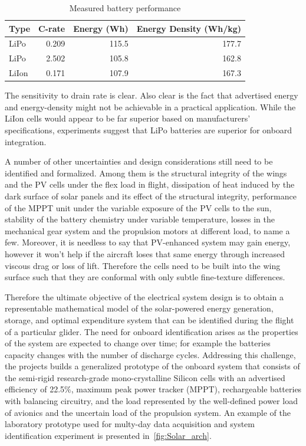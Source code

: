 \documentclass{ifacconf}
\begin{document}
\begin{table}
  \caption{Measured battery performance}
  \centering
  \begin{tabular}{ l | r | r | r }
  Type &C-rate & Energy (Wh) & Energy Density (Wh/kg) \\
  \hline
  LiPo & 0.209 & 115.5 & 177.7 \\
  LiPo & 2.502 & 105.8 & 162.8 \\
  LiIon & 0.171 & 107.9 & 167.3 \\
  \end{tabular}
  \label{Batt_performance}
\end{table}
The sensitivity to drain rate is clear. Also clear is the fact that advertised energy and energy-density might not be achievable in a practical application. While the LiIon cells would appear to be far superior based on manufacturers' specifications, experiments suggest that LiPo batteries are superior for onboard integration.

A number of other uncertainties and design considerations still need to be identified and formalized. Among them is the structural integrity of the wings and the PV cells under the flex load in flight, dissipation of heat induced by the dark surface of solar panels and its effect of the structural integrity,  performance of the MPPT unit under the variable exposure of the PV cells to the sun, stability of the battery chemistry under variable temperature, losses in the mechanical gear system and the propulsion motors at different load, to name a few. Moreover, it is needless to say that PV-enhanced system may gain energy, however it won't help if the aircraft loses that same energy through increased viscous drag or loss of lift. Therefore the cells need to be built into the wing surface such that they are conformal with only subtle fine-texture differences.

Therefore the ultimate objective of the electrical system design is to obtain a representable mathematical model of the solar-powered energy generation, storage, and optimal expenditure system that can be identified during the flight of a particular glider. The need for onboard identification arises as the properties of the system are expected to change over time; for example the batteries capacity changes with the number of discharge cycles. Addressing this challenge, the projects builds a generalized prototype of the onboard system that consists of the semi-rigid research-grade mono-crystalline Silicon cells with an advertised efficiency of 22.5$\%$, maximum peak power tracker (MPPT), rechargeable batteries with balancing circuitry, and the load represented by the well-defined power load of avionics and the uncertain load of the propulsion system. An example of the laboratory prototype used for multy-day data acquisition and system identification experiment is presented in~\ref{fig:Solar_arch}.
\end{document}
